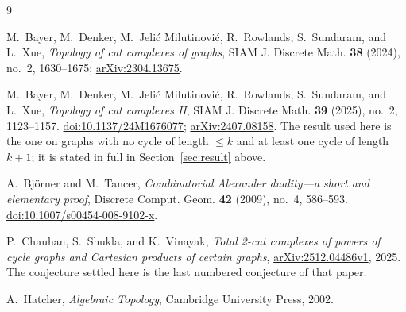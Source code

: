 \documentclass[11pt]{amsart}
\theoremstyle{definition}
\begin{document}
\begin{thebibliography}{9}

M.~Bayer, M.~Denker, M.~Jeli\'c Milutinovi\'c, R.~Rowlands, S.~Sundaram, and L.~Xue,
\emph{Topology of cut complexes of graphs},
SIAM J. Discrete Math. \textbf{38} (2024), no.~2, 1630--1675;
\href{https://arxiv.org/abs/2304.13675}{arXiv:2304.13675}.

M.~Bayer, M.~Denker, M.~Jeli\'c Milutinovi\'c, R.~Rowlands, S.~Sundaram, and L.~Xue,
\emph{Topology of cut complexes II},
SIAM J. Discrete Math. \textbf{39} (2025), no.~2, 1123--1157.
\href{https://doi.org/10.1137/24M1676077}{doi:10.1137/24M1676077};
\href{https://arxiv.org/abs/2407.08158}{arXiv:2407.08158}.
The result used here is the one on graphs with no cycle of length $\le k$ and at least one cycle of
length $k+1$; it is stated in full in Section~\ref{sec:result} above.

A.~Bj\"orner and M.~Tancer,
\emph{Combinatorial Alexander duality---a short and elementary proof},
Discrete Comput. Geom. \textbf{42} (2009), no.~4, 586--593.
\href{https://doi.org/10.1007/s00454-008-9102-x}{doi:10.1007/s00454-008-9102-x}.

P.~Chauhan, S.~Shukla, and K.~Vinayak,
\emph{Total 2-cut complexes of powers of cycle graphs and Cartesian products of certain graphs},
\href{https://arxiv.org/abs/2512.04486}{arXiv:2512.04486v1}, 2025.
The conjecture settled here is the last numbered conjecture of that paper.

A.~Hatcher,
\emph{Algebraic Topology},
Cambridge University Press, 2002.

\end{thebibliography}
\end{document}
